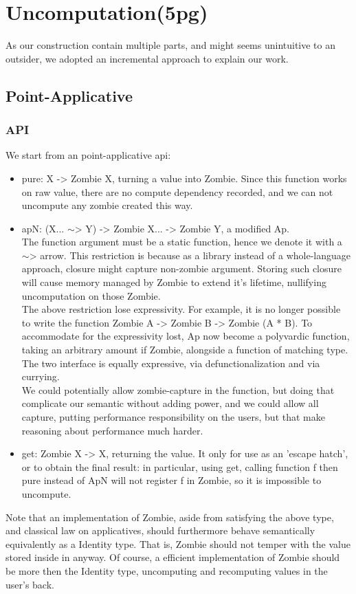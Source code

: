 \section{Uncomputation(5pg)}
As our construction contain multiple parts, and might seems unintuitive to an outsider, we adopted an incremental approach to explain our work.
\subsection{Point-Applicative}
\subsubsection{API}
We start from an point-applicative api:
\begin{itemize}
	\item pure: X -> Zombie X, turning a value into Zombie. Since this function works on raw value, there are no compute dependency recorded, and we can not uncompute any zombie created this way. \\

	\item apN: (X... $\sim$> Y) -> Zombie X... -> Zombie Y, a modified Ap. \\

	The function argument must be a static function, hence we denote it with a $\sim$> arrow. This restriction is because as a library instead of a whole-language approach, closure might capture non-zombie argument. Storing such closure will cause memory managed by Zombie to extend it's lifetime, nullifying uncomputation on those Zombie. \\

	The above restriction lose expressivity. For example, it is no longer possible to write the function Zombie A -> Zombie B -> Zombie (A * B). To accommodate for the expressivity lost, Ap now become a polyvardic function, taking an arbitrary amount if Zombie, alongside a function of matching type. \\


	The two interface is equally expressive, via defunctionalization and via currying. \\
	
	We could potentially allow zombie-capture in the function, but doing that complicate our semantic without adding power, and we could allow all capture, putting performance responsibility on the users, but that make reasoning about performance much harder. \\

	\item get: Zombie X -> X, returning the value. It only for use as an 'escape hatch', or to obtain the final result: in particular, using get, calling function f then pure instead of ApN will not register f in Zombie, so it is impossible to uncompute.
\end{itemize}
Note that an implementation of Zombie, aside from satisfying the above type, and classical law on applicatives, should furthermore behave semantically equivalently as a Identity type. That is, Zombie should not temper with the value stored inside in anyway. Of course, a efficient implementation of Zombie should be more then the Identity type, uncomputing and recomputing values in the user's back.
